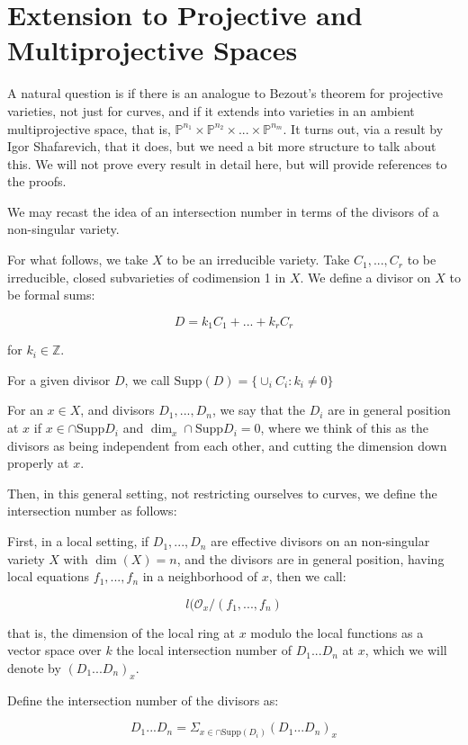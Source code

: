\documentclass[10pt]{article}
\begin{document}
\section{Extension to Projective and Multiprojective Spaces}

A natural question is if there is an analogue to Bezout's theorem for projective varieties, not just for curves, and if it extends into varieties in an ambient multiprojective space, that is, $\mathbb{P}^{n_1} \times \mathbb{P}^{n_2} \times ... \times \mathbb{P}^{n_m}$. It turns out, via a result by Igor Shafarevich, that it does, but we need a bit more structure to talk about this. We will not prove every result in detail here, but will provide references to the proofs.

We may recast the idea of an intersection number in terms of the divisors of a non-singular variety.

For what follows, we take $X$ to be an irreducible variety. Take $C_1,...,C_r$ to be irreducible, closed subvarieties of codimension 1 in $X$. We define a divisor on $X$ to be formal sums:

$$ D = k_1C_1 + ... + k_r C_r $$

for $k_i \in \mathbb{Z}$.

For a given divisor $D$, we call $\text{Supp}(D) = \{ \cup_i C_i : k_i \not = 0 \}$

For an $x \in X$, and divisors $D_1,...,D_n$, we say that the $D_i$ are in general position at $x$ if $x \in \cap \text{Supp} D_i$ and $\dim_x \cap \text{Supp}D_i = 0$, where we think of this as the divisors as being independent from each other, and cutting the dimension down properly at $x$.

Then, in this general setting, not restricting ourselves to curves, we define the intersection number as follows:

First, in a local setting, if $D_1,...,D_n$ are effective divisors on an non-singular variety $X$ with $\dim(X)= n$, and the divisors are in general position, having local equations $f_1,...,f_n$ in a neighborhood of $x$, then we call:

$$l(\mathcal{O}_x / (f_1,...,f_n) $$

that is, the dimension of the local ring at $x$ modulo the local functions as a vector space over $k$ the local intersection number of $D_1...D_n$ at $x$, which we will denote by $(D_1...D_n)_x$.

Define the intersection number of the divisors as:

$$ D_1...D_n = \Sigma_{x \in \cap \text{Supp}(D_i)} (D_1...D_n)_x$$
\end{document}
